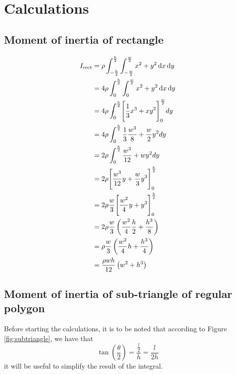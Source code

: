 \appendix

\section{Calculations}
\label{appendix:calculations}

\subsection{Moment of inertia of rectangle}
\begin{equation}
	\label{eq:rect_moment_long}
	\begin{split}
		I_{\text{rect}} & =
		\rho \int_{-\frac{h}{2}}^{\frac{h}{2}} \int_{-\frac{w}{2}}^{\frac{w}{2}}  x^2 + y^2 \mathop{}\!\mathrm{d} x \mathop{}\!\mathrm{d} y           \\
		& = 4 \rho \int_{0}^{\frac{h}{2}} \int_{0}^{\frac{w}{2}}  x^2 + y^2 \mathop{}\!\mathrm{d} x \mathop{}\!\mathrm{d} y           \\
		& = 4 \rho \int_{0}^{\frac{h}{2}} \Biggl[\frac{1}{3} x^3 + x y^2 \Biggr]_{0}^{\frac{w}{2}} dy \\
		& = 4 \rho \int_{0}^{\frac{h}{2}} \frac{1}{3} \frac{w^3}{8} + \frac{w}{2} y^2 dy              \\
		& = 2 \rho \int_{0}^{\frac{h}{2}} \frac{w^3}{12} + w y^2 dy                                   \\
		& = 2 \rho \Biggl[ \frac{w^3}{12}  y + \frac{w}{3} y^3 \Biggr]_{0}^{\frac{h}{2}}              \\
		& = 2 \rho \frac{w}{3} \Biggl[ \frac{w^2}{4}y + y^3 \Biggr]_{0}^{\frac{h}{2}}                 \\
		& = 2 \rho \frac{w}{3} \left( \frac{w^2}{4}\frac{h}{2} + \frac{h^3}{8} \right)                \\
		& = \rho \frac{w}{3} \left( \frac{w^2}{4}h + \frac{h^3}{4} \right)                            \\
		& = \frac{\rho wh}{12} \left( w^2 + h^3 \right)                                               \\
	\end{split}
\end{equation}

\newpage
\subsection{Moment of inertia of sub-triangle of regular polygon}
Before starting the calculations, it is to be noted that according to Figure
\ref{fig:subtriangle}, we have that
$$ \tan\left(\frac{\theta}{2}\right) = \frac{\frac{l}{2}}{h} = \frac{l}{2h} $$
it will be useful to simplify the result of the integral.

